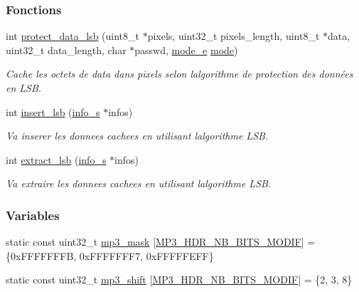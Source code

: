 \subsubsection*{Fonctions}
\begin{DoxyCompactItemize}
\item 
int \hyperlink{a00032_a72239fe09f5e932458901b822ccdf945}{protect\+\_\+data\+\_\+lsb} (uint8\+\_\+t $\ast$pixels, uint32\+\_\+t pixels\+\_\+length, uint8\+\_\+t $\ast$data, uint32\+\_\+t data\+\_\+length, char $\ast$passwd, \hyperlink{a00008_a3410d2f61b2ebef290660e7d14215bbd}{mode\+\_\+e} \hyperlink{a00008_a1a6b6fb557d8d37d59700faf4e4c9167}{mode})
\begin{DoxyCompactList}\small\item\em Cache les octets de data dans pixels selon l\textquotesingle{}algorithme de protection des données en L\+SB. \end{DoxyCompactList}\item 
int \hyperlink{a00032_a14e9d876697b0225ded31095c1076b64}{insert\+\_\+lsb} (\hyperlink{a00008_aa8ca908d92fb5bdd3c0a9e1f58b2cf03}{info\+\_\+s} $\ast$infos)
\begin{DoxyCompactList}\small\item\em Va inserer les donnees cachees en utilisant l\textquotesingle{}algorithme L\+SB. \end{DoxyCompactList}\item 
int \hyperlink{a00032_abc757e2627fc9971e388a584e0e0c2ca}{extract\+\_\+lsb} (\hyperlink{a00008_aa8ca908d92fb5bdd3c0a9e1f58b2cf03}{info\+\_\+s} $\ast$infos)
\begin{DoxyCompactList}\small\item\em Va extraire les donnees cachees en utilisant l\textquotesingle{}algorithme L\+SB. \end{DoxyCompactList}\end{DoxyCompactItemize}
\subsubsection*{Variables}
\begin{DoxyCompactItemize}
\item 
static const uint32\+\_\+t \hyperlink{a00032_ae3d02d9170a4bf482089f3d6f5606458}{mp3\+\_\+mask} \mbox{[}\hyperlink{a00089_a8922ae84b90bc792376936798a647326}{M\+P3\+\_\+\+H\+D\+R\+\_\+\+N\+B\+\_\+\+B\+I\+T\+S\+\_\+\+M\+O\+D\+IF}\mbox{]} = \{0x\+F\+F\+F\+F\+F\+F\+F\+B, 0x\+F\+F\+F\+F\+F\+F\+F7, 0x\+F\+F\+F\+F\+F\+E\+F\+F\}
\item 
static const uint32\+\_\+t \hyperlink{a00032_acd9a62842d3772d036c5ed36acbcc963}{mp3\+\_\+shift} \mbox{[}\hyperlink{a00089_a8922ae84b90bc792376936798a647326}{M\+P3\+\_\+\+H\+D\+R\+\_\+\+N\+B\+\_\+\+B\+I\+T\+S\+\_\+\+M\+O\+D\+IF}\mbox{]} = \{2, 3, 8\}
\end{DoxyCompactItemize}


